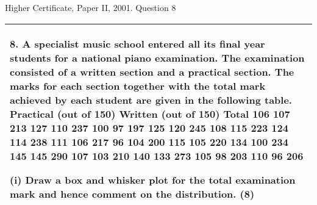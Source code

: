 \documentclass[a4paper,12pt]{article}
\begin{document}
Higher Certificate, Paper II, 2001. Question 8



 
 
 


\begin{table}[ht!]
 
\centering
 
\begin{tabular}{|p{15cm}|}
 
\hline  

8. A specialist music school entered all its final year students for a national piano examination.  
The examination consisted of a written section and a practical section.  
The marks for each section together with the total mark achieved by each student are given in the following table. 
 Practical (out of 150) Written (out of 150) 
Total 
106 107 213 127 110 237 100   97 197 125 120 245 108 115 223 124 114 238 111 106 217   
96 104 200 115 105 220 134 100 234 145 145 290 107 103 210 140 133 273 105   98 203 110   96 206 
 
(i) Draw a box and whisker plot for the total examination mark and hence comment on the distribution. (8) 
 
\\ \hline
  
\end{tabular}

\end{table}
\end{document}
